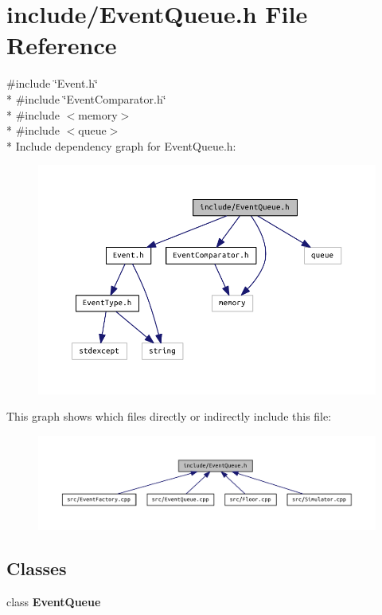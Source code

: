 \section{include/\+Event\+Queue.h File Reference}
\label{_event_queue_8h}
{\ttfamily \#include \char`\"{}Event.\+h\char`\"{}}\\*
{\ttfamily \#include \char`\"{}Event\+Comparator.\+h\char`\"{}}\\*
{\ttfamily \#include $<$memory$>$}\\*
{\ttfamily \#include $<$queue$>$}\\*
Include dependency graph for Event\+Queue.\+h\+:
\nopagebreak
\begin{figure}[H]
\begin{center}
\leavevmode
\includegraphics[width=350pt]{_event_queue_8h__incl}
\end{center}
\end{figure}
This graph shows which files directly or indirectly include this file\+:
\nopagebreak
\begin{figure}[H]
\begin{center}
\leavevmode
\includegraphics[width=350pt]{_event_queue_8h__dep__incl}
\end{center}
\end{figure}
\subsection*{Classes}
\begin{DoxyCompactItemize}
\item 
class {\bf Event\+Queue}
\end{DoxyCompactItemize}
